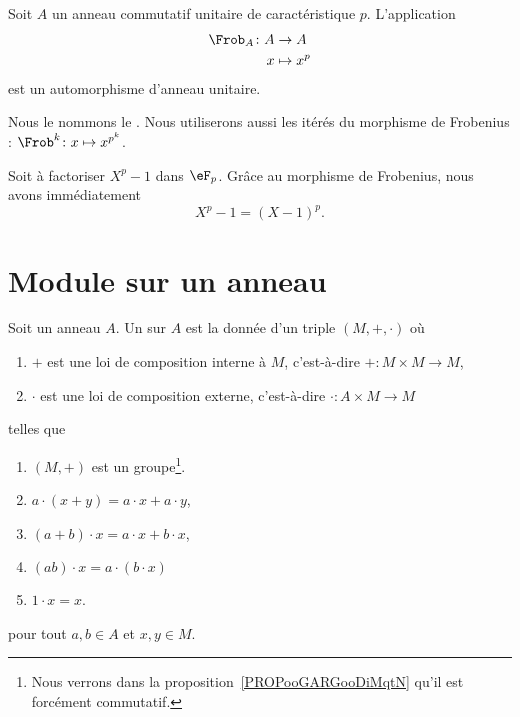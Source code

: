 \begin{proposition} \label{PropFrobHAMkTY}
    Soit \( A\) un anneau commutatif unitaire de caractéristique \( p\). L'application
    \begin{equation}
        \begin{aligned}
            \Frob_A\colon A&\to A \\
            x&\mapsto x^p
        \end{aligned}
    \end{equation}
    est un automorphisme d'anneau unitaire.
\end{proposition}
Nous le nommons le . Nous utiliserons aussi les itérés du morphisme de Frobenius : \( \Frob^k\colon x\mapsto x^{p^k}\).

\begin{example}
    Soit à factoriser \( X^p-1\) dans \( \eF_p\). Grâce au morphisme de Frobenius, nous avons immédiatement
    \begin{equation}
        X^p-1=(X-1)^p.
    \end{equation}
\end{example}

\section{Module sur un anneau}

\begin{definition}       \label{DEFooHXITooBFvzrR}
    Soit un anneau \( A\). Un  sur \( A\) est la donnée d'un triple \( (M,+,\cdot)\) où
    \begin{enumerate}
        \item
            \( +\) est une loi de composition interne à \( M\), c'est-à-dire \( +\colon M\times M\to M\),
        \item
            \( \cdot\) est une loi de composition externe, c'est-à-dire \( \cdot\colon A\times M\to M\)
    \end{enumerate}
    telles que
    \begin{enumerate}
        \item
            \( (M,+)\) est un groupe\footnote{Nous verrons dans la proposition~\ref{PROPooGARGooDiMqtN} qu'il est forcément commutatif.}.
        \item
            \( a\cdot(x+y)=a\cdot x+a\cdot y\),
        \item
            \( (a+b)\cdot x=a\cdot x+b\cdot x\),
        \item
            \( (ab)\cdot x=a\cdot(b\cdot x)\)
        \item
            \( 1\cdot x=x\).
    \end{enumerate}
    pour tout \( a,b\in A\) et \( x,y\in M\).
\end{definition}

